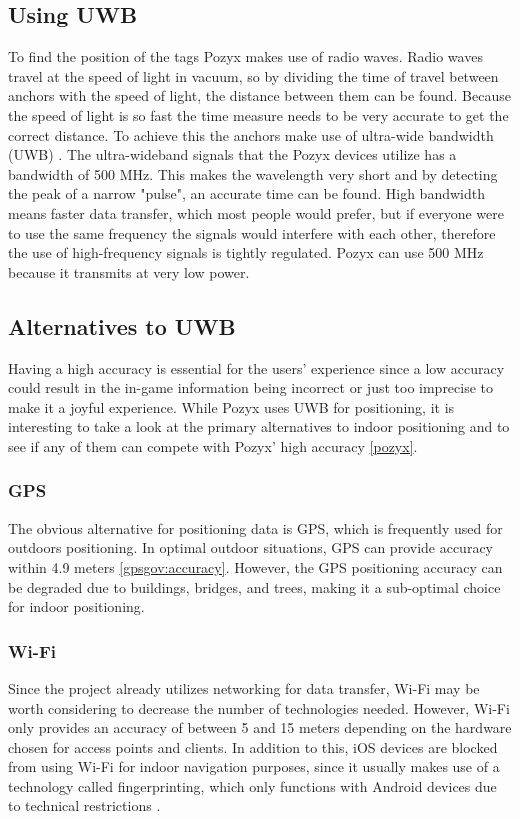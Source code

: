 \subsection{Using UWB}
To find the position of the tags Pozyx makes use of radio waves. 
Radio waves travel at the speed of light in vacuum, so by dividing the time of travel between anchors with the speed of light, the distance between them can be found.
Because the speed of light is so fast the time measure needs to be very accurate to get the correct distance.
To achieve this the anchors make use of ultra-wide bandwidth (UWB) \cite{pozyx-UWB}.
The ultra-wideband signals that the Pozyx devices utilize has a bandwidth of 500 MHz.
This makes the wavelength very short and by detecting the peak of a narrow "pulse", an accurate time can be found.
High bandwidth means faster data transfer, which most people would prefer, but if everyone were to use the same frequency the signals would interfere with each other, therefore the use of high-frequency signals is tightly regulated.
Pozyx can use 500 MHz because it transmits at very low power.

\subsection{Alternatives to UWB}
Having a high accuracy is essential for the users' experience since a low accuracy could result in the in-game information being incorrect or just too imprecise to make it a joyful experience.
While Pozyx uses UWB for positioning, it is interesting to take a look at the primary alternatives to indoor positioning and to see if any of them can compete with Pozyx' high accuracy \ref{pozyx}.

\subsubsection{GPS}
The obvious alternative for positioning data is GPS, which is frequently used for outdoors positioning.
In optimal outdoor situations, GPS can provide accuracy within 4.9 meters \ref{gpsgov:accuracy}.
However, the GPS positioning accuracy can be degraded due to buildings, bridges, and trees, making it a sub-optimal choice for indoor positioning.

\subsubsection{Wi-Fi}
Since the project already utilizes networking for data transfer, Wi-Fi may be worth considering to decrease the number of technologies needed.
However, Wi-Fi only provides an accuracy of between 5 and 15 meters depending on the hardware chosen for access points and clients.
In addition to this, iOS devices are blocked from using Wi-Fi for indoor navigation purposes, since it usually makes use of a technology called fingerprinting, which only functions with Android devices due to technical restrictions \cite{infsoft:wifi}.

